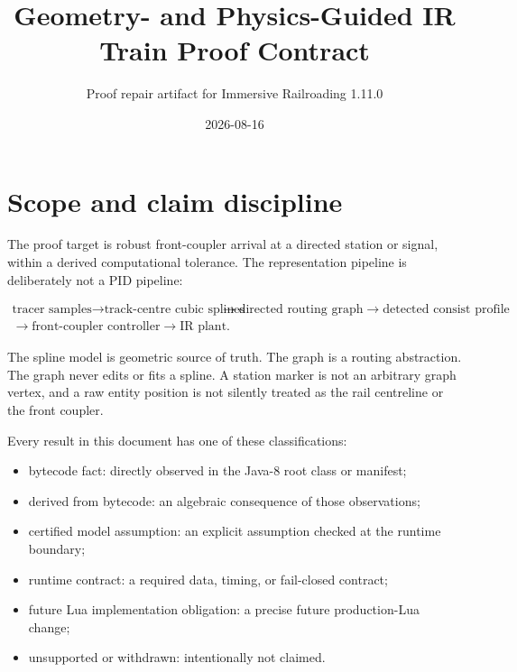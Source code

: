 \documentclass[10pt,a4paper]{article}
\title{Geometry- and Physics-Guided IR Train Proof Contract}
\author{Proof repair artifact for Immersive Railroading 1.11.0}
\date{2026-08-16}
\newcommand{\bytecode}{\textsf{bytecode fact}}
\newcommand{\model}{\textsf{certified model assumption}}
\newcommand{\runtime}{\textsf{runtime contract}}
\newcommand{\obligation}{\textsf{future Lua implementation obligation}}
\begin{document}
\maketitle

\begin{center}
\end{center}

\tableofcontents

\section{Scope and claim discipline}

The proof target is robust front-coupler arrival at a directed station or
signal, within a derived computational tolerance.  The representation pipeline
is deliberately not a PID pipeline:

\[
  \begin{split}
    \text{tracer samples}
    \longrightarrow \text{track-centre cubic splines}
    &\longrightarrow \text{directed routing graph}
    \longrightarrow \text{detected consist profile} \\
    \longrightarrow \text{front-coupler controller}
    \longrightarrow \text{IR plant}.
  \end{split}
\]

The spline model is geometric source of truth.  The graph is a routing
abstraction.  The graph never edits or fits a spline.  A station marker is not
an arbitrary graph vertex, and a raw entity position is not silently treated as
the rail centreline or the front coupler.

Every result in this document has one of these classifications:
\begin{itemize}
  \item \bytecode: directly observed in the Java-8 root class or manifest;
  \item derived from bytecode: an algebraic consequence of those observations;
  \item \model: an explicit assumption checked at the runtime boundary;
  \item \runtime: a required data, timing, or fail-closed contract;
  \item \obligation: a precise future production-Lua change;
  \item unsupported or withdrawn: intentionally not claimed.
\end{itemize}
\end{document}
